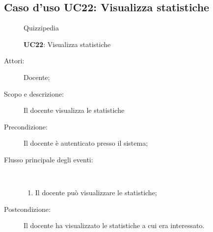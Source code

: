 \subsection{Caso d'uso UC22: Visualizza statistiche}
	\begin{figure}[H]
		\centering
		\begin{resizedtikzpicture}{\textwidth}
		\begin{umlsystem}[x=0, fill=lightgray!20]{Quizzipedia}
		\end{umlsystem}
		\end{resizedtikzpicture}
		\caption{\textbf{UC22}: Visualizza statistiche}
		\label{UC22}
	\end{figure}
\begin{description}
\item[Attori:] Docente;
\item[Scopo e descrizione:] Il docente visualizza le statistiche
      \item[Precondizione:] Il docente è autenticato presso il sistema;

        \item[Flusso principale degli eventi:] \ 
 \begin{enumerate}
          \item Il docente può visualizzare le statistiche;

      \end{enumerate}
    \item[Postcondizione:] Il docente ha visualizzato le statistiche a cui era interessato.
  \end{description}
\hypertarget{UC23}{}
